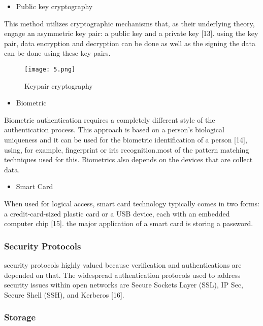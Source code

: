 \begin{itemize}
    \item Public key cryptography
\end{itemize}

This method utilizes cryptographic mechanisms that, as their underlying theory, engage an asymmetric key pair: a public key and a private key [13]. using the key pair, data encryption and decryption can be done as well as the signing the data can be done using these key pairs.

\begin{figure}[H]
    \centering
    \texttt{[image: 5.png]}
    \caption{Keypair cryptography}
    \label{fig:threshold}
  \end{figure}

  \begin{itemize}
    \item Biometric
\end{itemize}

Biometric authentication requires a completely different style of the authentication process. This approach is based on a person’s biological uniqueness and it can be used for the biometric identification of a person [14], using, for example, fingerprint or iris recognition.most of the pattern matching techniques used for this. Biometrics also depends on the devices that are collect data.

\begin{itemize}
    \item Smart Card
\end{itemize}

When used for logical access, smart card technology typically comes in two forms: a credit-card-sized plastic card or a USB device, each with an embedded computer chip [15]. the major application of a smart card is storing a password.

\subsubsection{Security Protocols}

security protocols highly valued because verification and authentications are depended on that. The widespread authentication protocols used to address security issues within open networks are Secure Sockets Layer (SSL), IP Sec, Secure Shell (SSH), and Kerberos [16]. 

\subsubsection{Storage}

